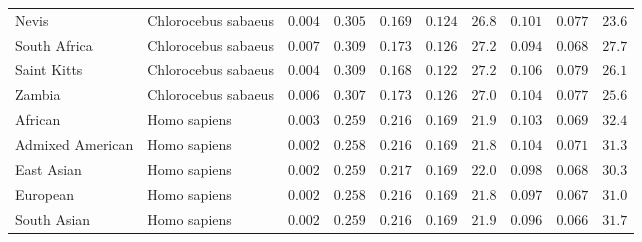 \documentclass{article}
\begin{document}
\begin{center}
\begin{longtable}{|l|l|r|r|r|r|r|r|r|r|}
            Nevis &  Chlorocebus sabaeus &               $ 0.004$ &                $ 0.305$ &        $ 0.169$ &              $ 0.124$ &           $  26.8$ & $ 0.101$ &     $ 0.077$ &  $  23.6$ \\
            South Africa &  Chlorocebus sabaeus &               $ 0.007$ &                $ 0.309$ &        $ 0.173$ &              $ 0.126$ &           $  27.2$ & $ 0.094$ &     $ 0.068$ &  $  27.7$ \\
            Saint Kitts &  Chlorocebus sabaeus &               $ 0.004$ &                $ 0.309$ &        $ 0.168$ &              $ 0.122$ &           $  27.2$ & $ 0.106$ &     $ 0.079$ &  $  26.1$ \\
            Zambia &  Chlorocebus sabaeus &               $ 0.006$ &                $ 0.307$ &        $ 0.173$ &              $ 0.126$ &           $  27.0$ & $ 0.104$ &     $ 0.077$ &  $  25.6$ \\
            African &         Homo sapiens &               $ 0.003$ &                $ 0.259$ &        $ 0.216$ &              $ 0.169$ &           $  21.9$ & $ 0.103$ &     $ 0.069$ &  $  32.4$ \\
            Admixed American &         Homo sapiens &               $ 0.002$ &                $ 0.258$ &        $ 0.216$ &              $ 0.169$ &           $  21.8$ & $ 0.104$ &     $ 0.071$ &  $  31.3$ \\
            East Asian &         Homo sapiens &               $ 0.002$ &                $ 0.259$ &        $ 0.217$ &              $ 0.169$ &           $  22.0$ & $ 0.098$ &     $ 0.068$ &  $  30.3$ \\
            European &         Homo sapiens &               $ 0.002$ &                $ 0.258$ &        $ 0.216$ &              $ 0.169$ &           $  21.8$ & $ 0.097$ &     $ 0.067$ &  $  31.0$ \\
            South Asian &         Homo sapiens &               $ 0.002$ &                $ 0.259$ &        $ 0.216$ &              $ 0.169$ &           $  21.9$ & $ 0.096$ &     $ 0.066$ &  $  31.7$ \\
        \end{longtable}

    \end{center}
\end{document}
